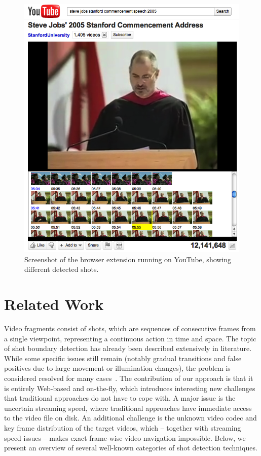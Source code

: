 \documentclass{acm_proc_article-sp}
\begin{document}
\begin{figure}
\begin{center}
   \includegraphics[width=0.85\linewidth]{./resources/stevejobs.png}
\end{center}
   \caption{Screenshot of the browser extension running on YouTube, showing different detected shots.}
\label{fig:screenshot}
\end{figure}

\section{Related Work} \label{sec:related-work}
Video fragments consist of shots, which are sequences of consecutive frames from a single viewpoint, representing a continuous action in time and space. The topic of shot boundary detection has already been described extensively in literature. While some specific issues still remain (notably gradual transitions and false positives due to large movement or illumination changes), the problem is considered resolved for many cases~\cite{Hanjalic2002, Yuan2007}. The contribution of our approach is that it is entirely Web-based and on-the-fly, which introduces interesting new challenges that traditional approaches do not have to cope with. A major issue is the uncertain streaming speed, where traditional approaches have immediate access to the video file on disk. An additional challenge is the unknown video codec and key frame distribution of the target videos, which -- together with streaming speed issues -- makes exact frame-wise video navigation impossible. Below, we present an overview of several well-known categories of shot detection techniques.
\end{document}
